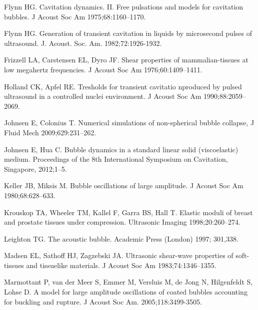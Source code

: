 \documentclass[%
preprint,%
author-year,%
]{jasatex}
\begin{document}
\begin{thebibliography}{00}
 Flynn HG. Cavitation
  dynamics. II. Free pulsations and models for cavitation bubbles. J
  Acoust Soc Am 1975;68:1160--1170.

 Flynn HG. Generation of transient
  cavitation in liquids by microsecond pulses of ultrasound.
  J. Acoust. Soc. Am.  1982;72:1926-1932.

 Frizzell LA,
  Carstensen EL, Dyro JF. Shear properties of mammalian-tissues at low
  megahertz frequencies. J Acoust Soc Am 1976;60:1409--1411.

 Holland CK, Apfel
  RE. Tresholds for transient cavitatio nproduced by pulsed ultrasound
  in a controlled nuclei environment.  J Acoust Soc Am
  1990;88:2059--2069.

 Johnsen E, Colonius T. 
  Numerical simulations of non-spherical bubble collapse, J Fluid Mech 2009;629:231--262.

 Johnsen E, Hua C. Bubble dynamics in a standard linear solid (viscoelastic) medium.  Proceedings of the 8th International Symposium on Cavitation, Singapore, 2012;1--5.  

 Keller JB, Miksis
  M. Bubble oscillations of large amplitude. J Acoust Soc Am
  1980;68:628--633.

 Krouskop TA,
  Wheeler TM, Kallel F, Garra BS, Hall T. Elastic moduli of breast and
  prostate tissues under compression. Ultrasonic Imaging
  1998;20:260--274.

 Leighton TG. The acoustic
  bubble. Academic Press (London) 1997; 301,338.

 Madsen EL, Sathoff
  HJ, Zagzebski JA. Ultrasonic shear-wave properties of soft-tissues
  and tissuelike materials. J Acoust Soc Am 1983;74:1346--1355.
  
 Marmottant P,
  van der Meer S, Emmer M, Versluis M, de Jong N, Hilgenfeldt S, Lohse
  D. A model for large amplitude oscillations of coated bubbles
  accounting for buckling and rupture. J Acoust Soc
  Am. 2005;118:3499-3505.


\end{thebibliography}
\end{document}
